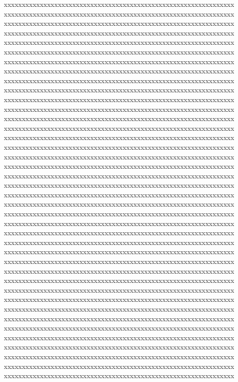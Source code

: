 {{xxxxxxxxxxxxxxxxxxxxxxxxxxxxxxxxxxxxxxxxxxxxxxxxxxxxxxxxxxxxxxxx%
xxxxxxxxxxxxxxxxxxxxxxxxxxxxxxxxxxxxxxxxxxxxxxxxxxxxxxxxxxxxxxxx%
xxxxxxxxxxxxxxxxxxxxxxxxxxxxxxxxxxxxxxxxxxxxxxxxxxxxxxxxxxxxxxxx%
xxxxxxxxxxxxxxxxxxxxxxxxxxxxxxxxxxxxxxxxxxxxxxxxxxxxxxxxxxxxxxxx%
xxxxxxxxxxxxxxxxxxxxxxxxxxxxxxxxxxxxxxxxxxxxxxxxxxxxxxxxxxxxxxxx%
xxxxxxxxxxxxxxxxxxxxxxxxxxxxxxxxxxxxxxxxxxxxxxxxxxxxxxxxxxxxxxxx%
xxxxxxxxxxxxxxxxxxxxxxxxxxxxxxxxxxxxxxxxxxxxxxxxxxxxxxxxxxxxxxxx%
xxxxxxxxxxxxxxxxxxxxxxxxxxxxxxxxxxxxxxxxxxxxxxxxxxxxxxxxxxxxxxxx%
xxxxxxxxxxxxxxxxxxxxxxxxxxxxxxxxxxxxxxxxxxxxxxxxxxxxxxxxxxxxxxxx%
xxxxxxxxxxxxxxxxxxxxxxxxxxxxxxxxxxxxxxxxxxxxxxxxxxxxxxxxxxxxxxxx%
xxxxxxxxxxxxxxxxxxxxxxxxxxxxxxxxxxxxxxxxxxxxxxxxxxxxxxxxxxxxxxxx%
xxxxxxxxxxxxxxxxxxxxxxxxxxxxxxxxxxxxxxxxxxxxxxxxxxxxxxxxxxxxxxxx%
xxxxxxxxxxxxxxxxxxxxxxxxxxxxxxxxxxxxxxxxxxxxxxxxxxxxxxxxxxxxxxxx%
xxxxxxxxxxxxxxxxxxxxxxxxxxxxxxxxxxxxxxxxxxxxxxxxxxxxxxxxxxxxxxxx%
xxxxxxxxxxxxxxxxxxxxxxxxxxxxxxxxxxxxxxxxxxxxxxxxxxxxxxxxxxxxxxxx%
xxxxxxxxxxxxxxxxxxxxxxxxxxxxxxxxxxxxxxxxxxxxxxxxxxxxxxxxxxxxxxxx%
xxxxxxxxxxxxxxxxxxxxxxxxxxxxxxxxxxxxxxxxxxxxxxxxxxxxxxxxxxxxxxxx%
xxxxxxxxxxxxxxxxxxxxxxxxxxxxxxxxxxxxxxxxxxxxxxxxxxxxxxxxxxxxxxxx%
xxxxxxxxxxxxxxxxxxxxxxxxxxxxxxxxxxxxxxxxxxxxxxxxxxxxxxxxxxxxxxxx%
xxxxxxxxxxxxxxxxxxxxxxxxxxxxxxxxxxxxxxxxxxxxxxxxxxxxxxxxxxxxxxxx%
xxxxxxxxxxxxxxxxxxxxxxxxxxxxxxxxxxxxxxxxxxxxxxxxxxxxxxxxxxxxxxxx%
xxxxxxxxxxxxxxxxxxxxxxxxxxxxxxxxxxxxxxxxxxxxxxxxxxxxxxxxxxxxxxxx%
xxxxxxxxxxxxxxxxxxxxxxxxxxxxxxxxxxxxxxxxxxxxxxxxxxxxxxxxxxxxxxxx%
xxxxxxxxxxxxxxxxxxxxxxxxxxxxxxxxxxxxxxxxxxxxxxxxxxxxxxxxxxxxxxxx%
xxxxxxxxxxxxxxxxxxxxxxxxxxxxxxxxxxxxxxxxxxxxxxxxxxxxxxxxxxxxxxxx%
xxxxxxxxxxxxxxxxxxxxxxxxxxxxxxxxxxxxxxxxxxxxxxxxxxxxxxxxxxxxxxxx%
xxxxxxxxxxxxxxxxxxxxxxxxxxxxxxxxxxxxxxxxxxxxxxxxxxxxxxxxxxxxxxxx%
xxxxxxxxxxxxxxxxxxxxxxxxxxxxxxxxxxxxxxxxxxxxxxxxxxxxxxxxxxxxxxxx%
xxxxxxxxxxxxxxxxxxxxxxxxxxxxxxxxxxxxxxxxxxxxxxxxxxxxxxxxxxxxxxxx%
xxxxxxxxxxxxxxxxxxxxxxxxxxxxxxxxxxxxxxxxxxxxxxxxxxxxxxxxxxxxxxxx%
xxxxxxxxxxxxxxxxxxxxxxxxxxxxxxxxxxxxxxxxxxxxxxxxxxxxxxxxxxxxxxxx%
xxxxxxxxxxxxxxxxxxxxxxxxxxxxxxxxxxxxxxxxxxxxxxxxxxxxxxxxxxxxxxxx%
xxxxxxxxxxxxxxxxxxxxxxxxxxxxxxxxxxxxxxxxxxxxxxxxxxxxxxxxxxxxxxxx%
xxxxxxxxxxxxxxxxxxxxxxxxxxxxxxxxxxxxxxxxxxxxxxxxxxxxxxxxxxxxxxxx%
xxxxxxxxxxxxxxxxxxxxxxxxxxxxxxxxxxxxxxxxxxxxxxxxxxxxxxxxxxxxxxxx%
xxxxxxxxxxxxxxxxxxxxxxxxxxxxxxxxxxxxxxxxxxxxxxxxxxxxxxxxxxxxxxxx%
xxxxxxxxxxxxxxxxxxxxxxxxxxxxxxxxxxxxxxxxxxxxxxxxxxxxxxxxxxxxxxxx%
xxxxxxxxxxxxxxxxxxxxxxxxxxxxxxxxxxxxxxxxxxxxxxxxxxxxxxxxxxxxxxxx%
xxxxxxxxxxxxxxxxxxxxxxxxxxxxxxxxxxxxxxxxxxxxxxxxxxxxxxxxxxxxxxxx%
xxxxxxxxxxxxxxxxxxxxxxxxxxxxxxxxxxxxxxxxxxxxxxxxxxxxxxxxxxxxxxxx%
}}
